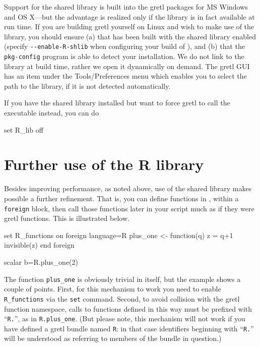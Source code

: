 Support for the  shared library is built into the gretl
packages for MS Windows and OS X---but the advantage is realized
only if the library is in fact available at run time.  If you are
building gretl yourself on Linux and wish to make use of the
 library, you should ensure (a) that  has been built
with the shared library enabled (specify \verb|--enable-R-shlib| when
configuring your build of ), and (b) that the \verb|pkg-config|
program is able to detect your  installation.  We do not link
to the  library at build time, rather we open it dynamically on
demand. The gretl GUI has an item under the
\textsf{Tools/Preferences} menu which enables you to select the
path to the library, if it is not detected automatically.  

If you have the  shared library installed but want to force
gretl to call the  executable instead, you can do
\begin{code}
set R_lib off
\end{code}

\section{Further use of the R library}
\label{sec:R-functions}

Besides improving performance, as noted above, use of the 
shared library makes possible a further refinement.  That is, you can
define functions in , within a \texttt{foreign} block, then
call those functions later in your script much as if they were
gretl functions.  This is illustrated below.  
%
\begin{code}
set R_functions on
foreign language=R
  plus_one <- function(q) {
     z = q+1
     invisible(z)
  }
end foreign

scalar b=R.plus_one(2)
\end{code}
%
The  function \verb|plus_one| is obviously trivial in itself,
but the example shows a couple of points.  First, for this mechanism
to work you need to enable \verb|R_functions| via the \texttt{set}
command.  Second, to avoid collision with the gretl function
namespace, calls to functions defined in this way must be prefixed
with ``\texttt{R.}'', as in \verb|R.plus_one|. (But please note, this
mechanism will not work if you have defined a gretl bundle named
\texttt{R}: in that case identifiers beginning with ``\texttt{R.{}}''
will be understood as referring to members of the bundle in question.)

